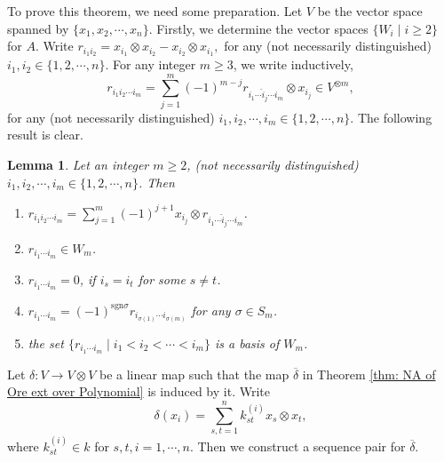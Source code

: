 \documentclass[a4paper,10pt]{amsart}
\newtheorem{lemma}[theorem]{Lemma}
\theoremstyle{definition}
\numberwithin{equation}{section}
\begin{document}
To prove this theorem, we need some preparation. Let $V$ be the vector space spanned by $\{x_1,x_2,\cdots,x_n\}$. Firstly, we determine the vector spaces $\{W_i\mid i\geq2\}$ for $A$. Write $
r_{i_1i_2}=x_{i_1}\otimes x_{i_2}-x_{i_2}\otimes x_{i_1},
$
for any (not necessarily distinguished) $i_1,i_2\in\{1,2,\cdots,n\}$. For any integer $m\geq3$, we write inductively,
$$
r_{i_1i_2\cdots i_m}=\sum_{j=1}^m (-1)^{m-j}r_{i_1\cdots \hat{i}_j \cdots i_{m}}\otimes x_{i_j}\in V^{\otimes m},
$$
for any (not necessarily distinguished) $i_1,i_2,\cdots,i_m\in \{1,2,\cdots,n\}$. The following result is clear.
\begin{lemma}\label{lemma: properties of r_i1i2...} Let an integer $m\geq 2$, (not necessarily distinguished) $i_1,i_2,\cdots,i_m\in \{1,2,\cdots,n\}$. Then
\begin{enumerate}
\item $r_{i_1i_2\cdots i_m}=\sum_{j=1}^m (-1)^{j+1}x_{i_j}\otimes r_{i_1\cdots \hat{i}_j \cdots i_{m}}$.
\item $r_{i_1\cdots i_m}\in W_m$.

\item $r_{i_1\cdots i_m}=0$, if $i_s=i_t$ for some $s\neq t$.

\item $r_{i_1\cdots i_m}=(-1)^{\mathrm{sgn}\sigma}r_{i_{\sigma(1)}\cdots i_{\sigma(m)}}$ for any $\sigma\in S_m$.

\item the set $\{r_{i_1\cdots i_m}\;|\; i_1<i_2<\cdots<i_m\}$ is a basis of $W_m$.
\end{enumerate}
\end{lemma}

Let $\delta:V\to V\otimes V$ be a linear map such that the map $\overline{\delta}$ in Theorem \ref{thm: NA of Ore ext over Polynomial} is induced by it. Write
$$
\delta(x_i)=\sum_{s,t=1}^n k_{st}^{(i)} x_s\otimes x_t,
$$
where $k_{st}^{(i)}\in k$ for $s,t,i=1,\cdots,n$. Then we construct a sequence pair for $\overline{\delta}$.
\end{document}
